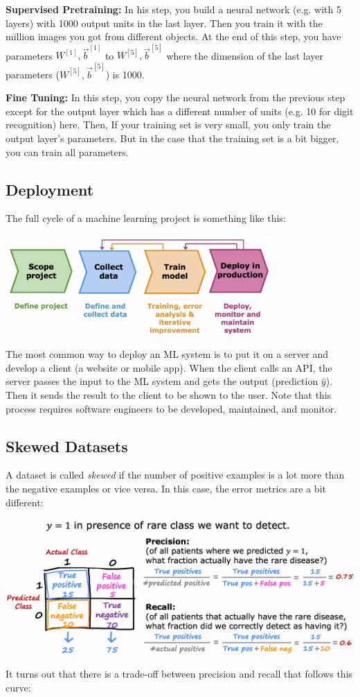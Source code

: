 \documentclass[a4paper, 12pt]{book}
\begin{document}
\textbf{Supervised Pretraining:} In his step, you build a neural network (e.g. with 5 layers) with 1000 output units in the last layer. Then you train it with the million images you got from different objects. At the end of this step, you have parameters $W^{[1]},\Vec{b}^{[1]}$ to $W^{[5]},\Vec{b}^{[5]}$ where the dimension of the last layer parameters ($W^{[5]},\Vec{b}^{[5]}$) is 1000.

\textbf{Fine Tuning:} In this step, you copy the neural network from the previous step except for the output layer which has a different number of units (e.g. 10 for digit recognition) here. Then, If your training set is very small, you only train the output layer's parameters. But in the case that the training set is a bit bigger, you can train all parameters.

\subsection{Deployment}
The full cycle of a machine learning project is something like this:
\begin{center}
    \includegraphics[width=4in]{graphics/Full_Cycle.png}
\end{center}
The most common way to deploy an ML system is to put it on a server and develop a client (a website or mobile app). When the client calls an API, the server passes the input to the ML system and gets the output (prediction $\hat{y}$). Then it sends the result to the client to be shown to the user. Note that this process requires software engineers to be developed, maintained, and monitor.

\subsection{Skewed Datasets}
A dataset is called \emph{skewed} if the number of positive examples is a lot more than the negative examples or vice versa. In this case, the error metrics are a bit different:

\begin{center}
    \includegraphics[width=5.5in]{graphics/skewed_dataset.png}
\end{center}
It turns out that there is a trade-off between precision and recall that follows this curve:
\end{document}
